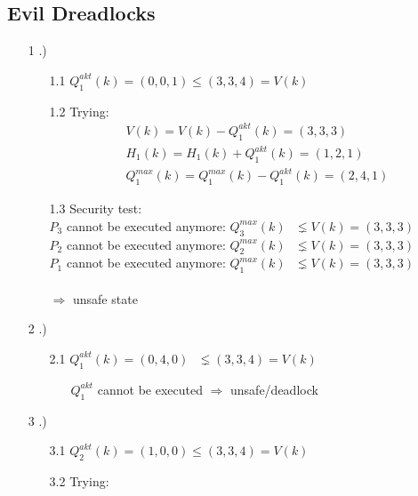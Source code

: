 \documentclass[a4paper, 11pt]{article}
\begin{document}
      \subsection{Evil Dreadlocks}
      \begin{enumerate}
            \item[1].)
            \begin{enumerate}
                \item[1.1] $Q_1^{akt}(k) = (0,0,1) \leq (3,3,4) = V(k)$
                \item[1.2] Trying:
                \begin{align*}
                    &V(k) = V(k) - Q_1^{akt}(k) = (3,3,3) \\
                    &H_1(k) = H_1(k) +Q_1^{akt}(k) = (1,2,1) \\
                    &Q_1^{max}(k) = Q_1^{max}(k) - Q_1^{akt}(k) = (2,4,1) 
                \end{align*} 
                \item[1.3] Security test: \\
                 $P_3$ cannot be executed anymore: $Q_3^{max}(k) \mbox{ } \lneq V(k) = (3,3,3)$ \\
                 $P_2$ cannot be executed anymore: $Q_2^{max}(k) \mbox{ } \lneq V(k) = (3,3,3)$ \\
                 $P_1$ cannot be executed anymore: $Q_1^{max}(k) \mbox{ } \lneq V(k) = (3,3,3)$ \\\\
                 $\Rightarrow$ unsafe state
            \end{enumerate}
            \item[2].)
            \begin{enumerate}
                \item[2.1] $Q_1^{akt}(k) = (0,4,0) \mbox{ } \lneq (3,3,4) = V(k)$
                \begin{enumerate}
                    \item[]  $Q_1^{akt}$ cannot be executed $\Rightarrow$ unsafe/deadlock
                \end{enumerate}
            \end{enumerate}
            \item[3].) 
            \begin{enumerate}
                \item[3.1] $Q_2^{akt}(k) = (1,0,0) \leq (3,3,4) = V(k)$
                \item[3.2] Trying: 

\end{enumerate}
\end{enumerate}
\end{document}
